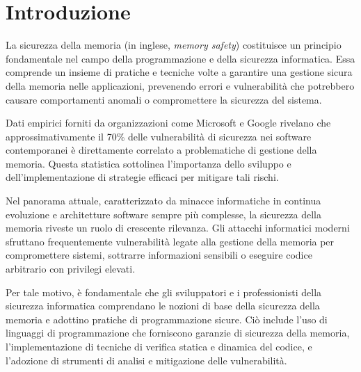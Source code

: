 \chapter{Introduzione}
\label{cha:introduction}

La sicurezza della memoria (in inglese, \textit{memory safety}) costituisce un
principio fondamentale nel campo della programmazione e della sicurezza
informatica. Essa comprende un insieme di pratiche e tecniche volte a garantire una
gestione sicura della memoria nelle applicazioni, prevenendo errori e
vulnerabilità che potrebbero causare comportamenti anomali o compromettere la
sicurezza del sistema.

\vspace{0.5em}

Dati empirici forniti da organizzazioni come Microsoft\cite{microsoft_proactive_approach}
e Google\cite{chromium_memory_safety} rivelano che approssimativamente il 70\%
delle vulnerabilità di sicurezza nei software contemporanei è direttamente
correlato a problematiche di gestione della memoria. Questa statistica sottolinea
l'importanza dello sviluppo e dell'implementazione di strategie efficaci per mitigare
tali rischi.

\vspace{0.5em}

Nel panorama attuale, caratterizzato da minacce informatiche in continua evoluzione
e architetture software sempre più complesse, la sicurezza della memoria riveste
un ruolo di crescente rilevanza. Gli attacchi informatici moderni sfruttano frequentemente
vulnerabilità legate alla gestione della memoria per compromettere sistemi,
sottrarre informazioni sensibili o eseguire codice arbitrario con privilegi
elevati.

\vspace{0.5em}

Per tale motivo, è fondamentale che gli sviluppatori e i professionisti della
sicurezza informatica comprendano le nozioni di base della sicurezza della
memoria e adottino pratiche di programmazione sicure. Ciò include l'uso di linguaggi
di programmazione che forniscono garanzie di sicurezza della memoria, l'implementazione
di tecniche di verifica statica e dinamica del codice, e l'adozione di strumenti
di analisi e mitigazione delle vulnerabilità.